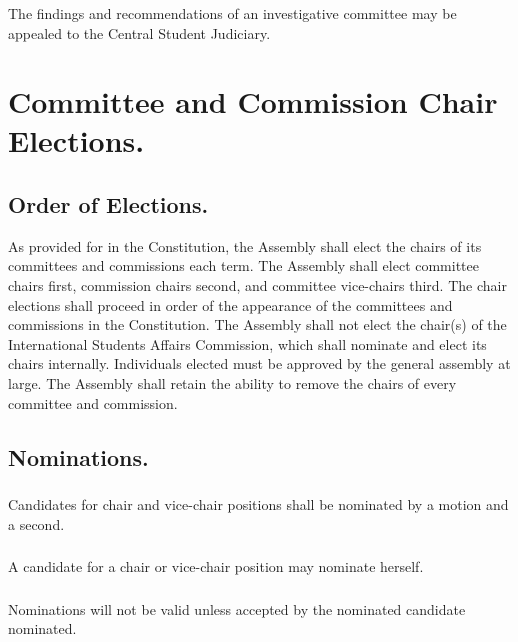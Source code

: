 \subsubsection{}
The findings and recommendations of an investigative committee may be appealed to the Central Student Judiciary.


\section{Committee and Commission Chair Elections.}

\subsection{Order of Elections.}
As provided for in the Constitution, the Assembly shall elect the chairs of its committees and commissions each term.  The Assembly shall elect committee chairs first, commission chairs second, and committee vice-chairs third.  The chair elections shall proceed in order of the appearance of the committees and commissions in the Constitution.  The Assembly shall not elect the chair(s) of the International Students Affairs Commission, which shall nominate and elect its chairs internally.  Individuals elected must be approved by the general assembly at large.  The Assembly shall retain the ability to remove the chairs of every committee and commission.


\subsection{Nominations.}

\subsubsection{}
Candidates for chair and vice-chair positions shall be nominated by a motion and a second.

\subsubsection{}
A candidate for a chair or vice-chair position may nominate herself.

\subsubsection{}
Nominations will not be valid unless accepted by the nominated candidate nominated. 

